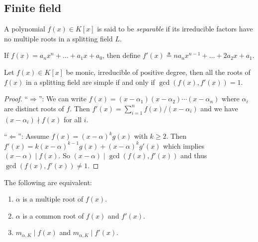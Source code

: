 \subsection{Finite field}

\begin{definition}
  A polynomial $f(x) \in K[x]$ is said to be \emph{separable}
  if its irreducible factors have no multiple roots in a splitting field $L$.
\end{definition}

\begin{definition}
  If $f(x) = a_n x^n + \dots + a_1 x + a_0$, then define $f'(x) \triangleq n a_n x^{n-1} + \dots + 2a_2 x + a_1$.
\end{definition}

\begin{theorem} \label{thm:multiple-root-condition}
  Let $f(x) \in K[x]$ be monic, irreducible of positive degree, then all the roots of $f(x)$
  in a splitting field are simple if and only if $\gcd(f(x), f'(x)) = 1$.

  \begin{proof}
    ``$\Rightarrow$'': We can write $f(x) = (x - \alpha_1) (x - \alpha_2) \dotsm (x - \alpha_n)$ where
    $\alpha_i$ are distinct roots of $f$. Then $f'(x) = \sum_{i = 1}^n f(x) / (x - \alpha_i)$
    and we have $(x - \alpha_i) \nmid f(x)$ for all $i$.

    ``$\Leftarrow$'': Assume $f(x) = (x - \alpha)^k g(x)$ with $k \geq 2$.
    Then $f'(x) = k (x - \alpha)^{k-1} g(x) + (x - \alpha)^k g'(x)$ which implies $(x - \alpha) \mid f(x)$.
    So $(x - \alpha) \mid \gcd(f(x), f'(x))$ and thus $\gcd(f(x), f'(x)) \neq 1$.
  \end{proof}
\end{theorem}

\begin{remark}
  The following are equivalent:
  \begin{enumerate}
    \item $\alpha$ is a multiple root of $f(x)$.
    \item $\alpha$ is a common root of $f(x)$ and $f'(x)$.
    \item $m_{\alpha, K} \mid f(x)$ and $m_{\alpha, K} \mid f'(x)$.
  \end{enumerate}
\end{remark}

